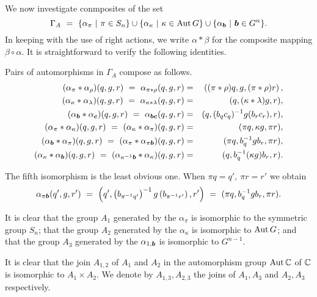 \medskip
We now investigate conmposites of the set 
$$
\Gamma_A ~=~ \{\alpha_{\pi} ~|~ \pi \in S_n\} \cup 
             \{\alpha_{\kappa} ~|~ \kappa \in \mathrm{Aut}\,G\} \cup 
             \{\alpha_{\boldsymbol{b}} ~|~ \boldsymbol{b} \in G^n\}. 
$$
In keeping with the use of right actions, we write $\alpha*\beta$ 
for the composite mapping $\beta\circ\alpha$. 
It is straightforward to verify the following identities. 
\begin{lem} \label{lem:autopairs} 
Pairs of automorphisms in $\Gamma_A$ compose as follows.
\begin{eqnarray*}
(\alpha_{\pi}*\alpha_{\rho})(q,g,r) 
       ~=~  \alpha_{\pi*\rho}(q,g,r) 
  &=& \left( (\pi*\rho)q,g,(\pi*\rho)r \right), \\
(\alpha_{\kappa}*\alpha_{\lambda})(q,g,r) 
       ~=~  \alpha_{\kappa*\lambda}(q,g,r) 
  &=& (q,(\kappa*\lambda)g,r), \\
(\alpha_{\boldsymbol{b}}*\alpha_{\boldsymbol{c}})(q,g,r) 
       ~=~  \alpha_{\boldsymbol{b}\boldsymbol{c}}(q,g,r) 
  &=& (q,(b_qc_q)^{-1}g(b_rc_r),r), \\ 
(\alpha_{\pi}*\alpha{_\kappa})(q,g,r) 
       ~=~  (\alpha_{\kappa}*\alpha_{\pi})(q,g,r) 
  &=& (\pi q, \kappa g, \pi r), \\
(\alpha_{\boldsymbol{b}}*\alpha_{\pi})(q,g,r) 
       ~=~  (\alpha_{\pi}*\alpha_{\pi\boldsymbol{b}})(q,g,r) 
  &=& (\pi q, b_q^{-1}gb_r, \pi r), \\
(\alpha_{\kappa}*\alpha_{\boldsymbol{b}})(q,g,r) 
       ~=~  (\alpha_{\kappa^{-1}\boldsymbol{b}}*\alpha_{\kappa})(q,g,r) 
  &=& (q,b_q^{-1}(\kappa g)b_r,r). 
\end{eqnarray*}
\end{lem}
\begin{pf}
The fifth isomorphism is the least obvious one. 
When $\pi q = q',~ \pi r = r'$ we obtain  
$$
\alpha_{\pi\boldsymbol{b}}(q',g,r') ~=~ 
\left(q',\left(b_{\pi^{-1}q'}\right)^{-1}g\left(b_{\pi^{-1}r'}\right),r'\right)
~=~ (\pi q, b_q^{-1}gb_r,\pi r). 
$$
\end{pf}

It is clear that the group $A_1$ generated by the $\alpha_{\pi}$ 
is isomorphic to the symmetric group $S_n$; 
that the group $A_2$ generated by the $\alpha_{\kappa}$ 
is isomorphic to $\mathrm{Aut}\,G$; 
and that the group $A_3$ generated by the $\alpha_{1,\boldsymbol{b}}$ 
is isomorphic to $G^{n-1}$. 

It is clear that the join $A_{1,2}$ of $A_1$ and $A_2$ in the 
automorphism group $\mathrm{Aut}\,\mathbb{C}$ of $\mathbb{C}$ is isomorphic to $A_1 \times A_2$.  
We denote by $A_{1,3},A_{2,3}$ the joins of $A_1,A_3$ and $A_2,A_3$ 
respectively. 

